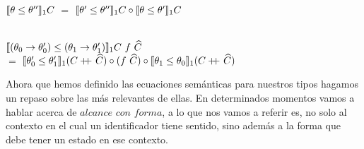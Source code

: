 \begin{definition}
\indent
$\llbracket \theta \leq \theta'' \rrbracket_1 C$ $=$ 
					$\llbracket \theta' \leq \theta'' \rrbracket_1 C \circ \llbracket \theta \leq \theta' \rrbracket_1 C$\\
\

\indent
$\semBrcks{(\theta_0 \rightarrow \theta'_0) \leq (\theta_1 \rightarrow \theta'_1)}_1 C \ f \ \widehat{C}$ \\
			\indent \indent \indent \indent \indent \indent
			$=$ 
			$\llbracket \theta'_0 \leq \theta'_1 \rrbracket_1 (C +\kern-1.3ex+\kern0.8ex \widehat{C}) 
				\circ 
			(f \ \widehat{C}) 
				\circ 
			\llbracket \theta_1 \leq \theta_0 \rrbracket_1 (C +\kern-1.3ex+\kern0.8ex \widehat{C}) 
			$\\

\end{definition}

Ahora que hemos definido las ecuaciones sem\'anticas para nuestros tipos 
hagamos un repaso sobre las m\'as relevantes de ellas. En determinados momentos
vamos a hablar acerca de $\textit{alcance con forma}$, a lo que nos vamos
a referir es, no solo al contexto en el cual un identificador tiene sentido,
sino adem\'as a la forma que debe tener un estado en ese contexto.

